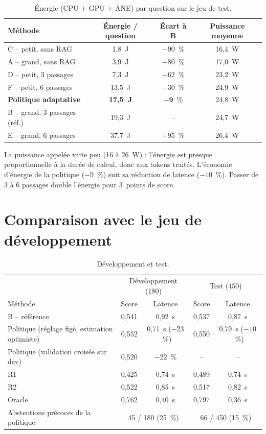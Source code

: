 \documentclass[11pt,a4paper]{article}
\begin{document}
\begin{table}[H]
\centering\small
\begin{tabular}{l c c c}
\toprule
Méthode & Énergie / question & Écart à B & Puissance moyenne \\
\midrule
C -- petit, sans RAG & 1,8~J & $-90$~\% & 16,4~W \\
A -- grand, sans RAG & 3,9~J & $-80$~\% & 17,0~W \\
D -- petit, 3 passages & 7,3~J & $-62$~\% & 23,2~W \\
F -- petit, 6 passages & 13,5~J & $-30$~\% & 24,9~W \\
\textbf{Politique adaptative} & \textbf{17,5~J} & $\mathbf{-9}$~\% & 24,8~W \\
B -- grand, 3 passages (réf.) & 19,3~J & -- & 24,7~W \\
E -- grand, 6 passages & 37,7~J & $+95$~\% & 26,4~W \\
\bottomrule
\end{tabular}
\caption{Énergie (CPU + GPU + ANE) par question sur le jeu de test.}
\label{tab:energie}
\end{table}

La puissance appelée varie peu (16 à 26~W) : l'énergie est presque proportionnelle à la durée de
calcul, donc aux tokens traités. L'économie d'énergie de la politique ($-9$~\%) suit sa réduction de
latence ($-10$~\%). Passer de 3 à 6 passages double l'énergie pour 3~points de score.

\section{Comparaison avec le jeu de développement}\label{sec:dev-test}

\begin{table}[H]
\centering\small
\begin{tabular}{l c c c c}
\toprule
& \multicolumn{2}{c}{Développement (180)} & \multicolumn{2}{c}{Test (450)} \\
Méthode & Score & Latence & Score & Latence \\
\midrule
B -- référence & 0,541 & 0,92~s & 0,537 & 0,87~s \\
Politique (réglage figé, estimation optimiste) & 0,552 & 0,71~s ($-23$~\%) & 0,550 & 0,79~s ($-10$~\%) \\
Politique (validation croisée sur dev) & 0,520 & $-22$~\% & -- & -- \\
R1 & 0,425 & 0,74~s & 0,489 & 0,74~s \\
R2 & 0,522 & 0,85~s & 0,517 & 0,82~s \\
Oracle & 0,762 & 0,40~s & 0,797 & 0,36~s \\
\midrule
Abstentions précoces de la politique & \multicolumn{2}{c}{45 / 180 (25~\%)} & \multicolumn{2}{c}{66 / 450 (15~\%)} \\
\bottomrule
\end{tabular}
\caption{Développement et test.}
\label{tab:dev-test}
\end{table}
\end{document}
